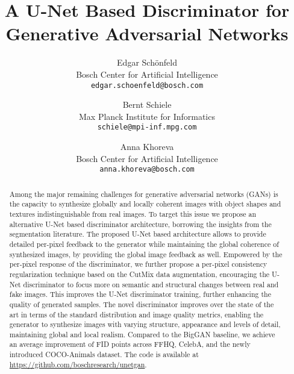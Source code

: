 \documentclass[10pt,twocolumn,letterpaper]{article}
\begin{document}
\title{\vspace{-3em}A U-Net Based Discriminator for Generative Adversarial Networks}
\author{Edgar Sch{\"o}nfeld\\
	Bosch Center for Artificial Intelligence\\
	\texttt{edgar.schoenfeld@bosch.com} \\
	\and
	Bernt Schiele\\
	Max Planck Institute for Informatics\\
	\texttt{schiele@mpi-inf.mpg.com} 
	\and
	Anna Khoreva \\
	Bosch Center for Artificial Intelligence\\
	\texttt{anna.khoreva@bosch.com} \\
}

\maketitle

\begin{abstract}
\vspace{-1.0em}
Among the major remaining challenges for generative adversarial networks (GANs) is the capacity to synthesize globally and locally coherent images with object shapes and textures indistinguishable from real images. To target this issue we propose an alternative U-Net based discriminator architecture, borrowing the insights from the segmentation literature. The proposed U-Net based architecture allows to provide detailed per-pixel feedback to the generator while maintaining the global coherence of synthesized images, by providing the global image feedback as well.
Empowered by the per-pixel response of the discriminator,
we further propose a per-pixel consistency regularization technique based on the CutMix data augmentation, encouraging the U-Net discriminator to focus more on
semantic and structural changes between real and fake images.
This improves the U-Net discriminator training, further enhancing the quality of generated samples.
The novel discriminator improves over the state of the art in terms of the standard distribution and image quality metrics, enabling the generator to synthesize images with varying structure, appearance and levels of detail, maintaining global and local realism. 
Compared to the BigGAN baseline, we achieve an average improvement of  FID points across FFHQ, CelebA, and the newly introduced COCO-Animals dataset. The code is available at \url{https://github.com/boschresearch/unetgan}.











\end{abstract}
\end{document}
